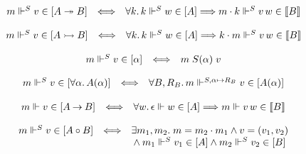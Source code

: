 \documentclass[10pt,a4paper]{amsart}
\begin{document}
  
\par  \quad  \[\begin{array}[]{lcl}m\Vdash^{S}v\in[A\twoheadrightarrow B]&\Longleftrightarrow&\forall k.\,k\Vdash^{S}w\in[A]\Longrightarrow m\cdot k\Vdash^{S}v\,w\in\llbracket B\rrbracket\end{array}\]\quad  \quad  
  
 
  
\par  \quad  \[\begin{array}[]{lcl}m\Vdash^{S}v\in[A\rightarrowtail B]&\Longleftrightarrow&\forall k.\,k\Vdash^{S}w\in[A]\Longrightarrow k\cdot m\Vdash^{S}v\,w\in\llbracket B\rrbracket\end{array}\]\quad  \quad  
  
 
  
\par  \quad  \[\begin{array}[]{lcl}m\Vdash^{S}v\in[\alpha]&\Longleftrightarrow&m\mathrel{S(\alpha)}v\end{array}\]\quad  \quad  
  
 
  
\par  \quad  \[\begin{array}[]{lcl}m\Vdash^{S}v\in[\forall\alpha.\,A(\alpha)]&\Longleftrightarrow&\forall B,R_{B}.\,m\Vdash^{S,\alpha\mapsto R_{B}}v\in[A(\alpha)]\end{array}\]\quad  \quad  
  
 
  
\par  \quad  \[\begin{array}[]{lcl}m\Vdash v\in[A\mathbin{\rightarrow}B]&\Longleftrightarrow&\forall w.\,\epsilon\Vdash w\in[A]\Longrightarrow m\Vdash v\,w\in\llbracket B\rrbracket\end{array}\]\quad  \quad  
  
 
  
\par  \quad  \[\begin{array}[]{lcl}m\Vdash^{S}v\in[A\mathbin{\circ}B]&\Longleftrightarrow&\exists m_{1},m_{2}.\;m=m_{2}\cdot m_{1}\land v=(v_{1},v_{2})\\
&&\hbox{}\land m_{1}\Vdash^{S}v_{1}\in[A]\land m_{2}\Vdash^{S}v_{2}\in[B]\end{array}\]\quad  \quad  
  
\end{document}
